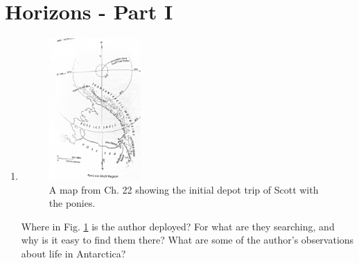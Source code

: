 \documentclass{article}
\begin{document}
\section{Horizons - Part I}

\begin{enumerate}
\item
\begin{figure}[hb]
\centering
\includegraphics[width=0.33\textwidth,angle=0,trim=1cm 1cm 1cm 1cm,clip=true]{Map3.jpg}
\caption{\label{fig:Map3} A map from Ch. 22 showing the initial depot trip of Scott with the ponies.}
\end{figure}
Where in Fig. \ref{fig:Map3} is the author deployed?  For what are they searching, and why is it easy to find them there?  What are some of the author's observations about life in Antarctica?
\end{enumerate}
\end{document}
